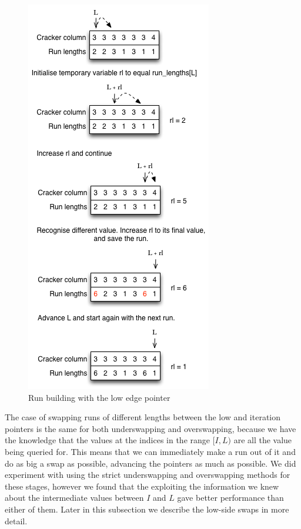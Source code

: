 \begin{figure}[H]
  \centering
  \includegraphics[]{images/d12_rle_run_building}
  \caption{Run building with the low edge pointer}
  \label{fig:rle_run_building}
\end{figure}

The case of swapping runs of different lengths between the low and iteration pointers is the same for both underswapping and overswapping, because we have the knowledge that the values at the indices in the range $[I, L)$ are all the value being queried for. This means that we can immediately make a run out of it and do as big a swap as possible, advancing the pointers as much as possible. We did experiment with using the strict underswapping and overswapping methods for these stages, however we found that the exploiting the information we knew about the intermediate values between $I$ and $L$ gave better performance than either of them. Later in this subsection we describe the low-side swaps in more detail.

